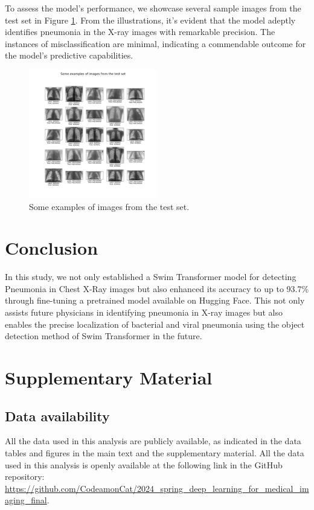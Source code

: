 \documentclass{article}
\begin{document}
To assess the model's performance, we showcase several sample images from the test set in Figure \ref{fig:example}. From the illustrations, it's evident that the model adeptly identifies pneumonia in the X-ray images with remarkable precision. The instances of misclassification are minimal, indicating a commendable outcome for the model's predictive capabilities.

\begin{figure}[!htb]
  \centering
  \includegraphics[width=0.5\textwidth]{./results/image/some_result.png}
  \caption{Some examples of images from the test set.}
  \label{fig:example}
\end{figure}

\section{Conclusion}
In this study, we not only established a Swim Transformer model for detecting Pneumonia in Chest X-Ray images but also enhanced its accuracy to up to 93.7\% through fine-tuning a pretrained model available on Hugging Face. This not only assists future physicians in identifying pneumonia in X-ray images but also enables the precise localization of bacterial and viral pneumonia using the object detection method of Swim Transformer in the future.




\clearpage
\section{Supplementary Material}
\subsection{Data availability}
All the data used in this analysis are publicly available, as indicated in the data tables and figures in the main text and the supplementary material. All the data used in this analysis is openly available at the following link in the GitHub repository: \url{https://github.com/CodeamonCat/2024_spring_deep_learning_for_medical_imaging_final}.
\end{document}

